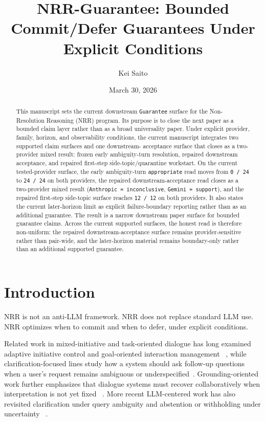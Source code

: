 \documentclass[11pt]{article}
\title{NRR-Guarantee: Bounded Commit/Defer Guarantees Under Explicit Conditions}
\author{Kei Saito}
\date{March 30, 2026}
\begin{document}
\maketitle

\begin{abstract}
This manuscript sets the current downstream \texttt{Guarantee} surface for the
Non-Resolution Reasoning (NRR) program. Its purpose is to close the next paper
as a bounded claim layer rather than as a broad universality paper. Under
explicit provider, family, horizon, and observability conditions, the current
manuscript integrates two supported claim surfaces and one downstream-
acceptance surface that closes as a two-provider mixed result: frozen early
ambiguity-turn resolution, repaired downstream acceptance, and repaired
first-step side-topic/quarantine workstart. On the current tested-provider
surface, the early ambiguity-turn \texttt{appropriate} read moves from
\texttt{0 / 24} to \texttt{24 / 24} on both providers, the repaired
downstream-acceptance read closes as a two-provider mixed result
(\texttt{Anthropic = inconclusive}, \texttt{Gemini = support}), and the
repaired first-step side-topic surface reaches \texttt{12 / 12} on both
providers. It also states the current later-horizon limit as explicit
failure-boundary reporting rather than as an additional guarantee. The result
is a narrow downstream paper surface for bounded guarantee claims. Across the
current supported surfaces, the honest read is therefore non-uniform: the
repaired downstream-acceptance surface remains provider-sensitive rather than
pair-wide, and the later-horizon material remains boundary-only rather than an
additional supported guarantee.
\end{abstract}

\section{Introduction}

NRR is not an anti-LLM framework. NRR does not replace standard LLM use. NRR
optimizes when to commit and when to defer, under explicit conditions.

Related work in mixed-initiative and task-oriented dialogue has long examined
adaptive initiative control and goal-oriented interaction management
~\cite{chucarroll2000mimic,saito2017taskdialogue}, while clarification-focused lines
study how a system should ask follow-up questions when a user's request remains
ambiguous or underspecified~\cite{deboni2003clarification,rao2018evpi,hu2020interactive}. Grounding-oriented work further emphasizes that dialogue systems
must recover collaboratively when interpretation is not yet fixed
~\cite{benotti2021groundedclarifications,benotti2021grounding}. More recent
LLM-centered work has also revisited clarification under query ambiguity and
abstention or withholding under uncertainty
~\cite{sahay-etal-2025-ask,wen-etal-2025-know,madhusudhan-etal-2025-llms}.
\end{document}

